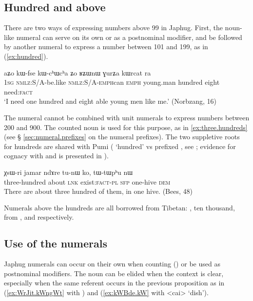 \subsection{Hundred and above} \label{sec.hundred.plus}
 There are two ways of expressing numbers above 99 in Japhug. First, the noun-like numeral  can serve on its own or as a postnominal modifier, and be followed by another numeral to express a number between 101 and 199, as in (\ref{ex:hundred}).

\begin{exe}
\ex \label{ex:hundred} 
\gll aʑo 	kɯ-fse 	kɯ-cʰɯ\redp{}cʰa 	ʑo 	ʁʑɯnɯ 	ɣurʑa 	kɯrcat 	ra \\
\textsc{1sg} \textsc{nmlz}:S/A-be.like  \textsc{nmlz}:S/A-\textsc{emph}\redp{}can \textsc{emph} young.man hundred eight need:\textsc{fact} \\
\glt `I need one hundred and eight able young men like me.' (Norbzang, 16)
\end{exe}

The numeral  cannot be combined with unit numerals to express numbers between 200 and 900. The counted noun  is used for this purpose, as in \ref{ex:three.hundreds} (see § \ref{sec:numeral.prefixes} on the numeral prefixes). The two suppletive roots for hundreds are shared with Pumi ( `hundred' vs prefixed , see \citealt[101]{daudey14grammar}; evidence for cognacy with  and  is presented in \citealt{jacques17num}).

\begin{exe}
\ex \label{ex:three.hundreds}
\gll χsɯ-ri 	jamar 	ndɤre 	tu-nɯ 	ko, 	tɯ-tɯpʰu 	nɯ \\
three-hundred about \textsc{lnk} exist:\textsc{fact-pl} \textsc{sfp} one-hive \textsc{dem} \\
\glt There are about three hundred of them, in one hive. (Bees, 48)
\end{exe}
 
  Numerals above the hundreds are all borrowed from Tibetan: ,  {ten thousand},  from ,  and  respectively.  
 
 \subsection{Use of the numerals}  \label{sec:uses.numerals}
 Japhug numerals can occur on their own when counting () or be used as postnominal modifiers. The noun can be elided when the context is clear, especially when the same referent occurs in the previous proposition as in (\ref{ex:WrJit.kWngWt}  with ) and (\ref{ex:kWBde.kW} with <cai> `dish').

